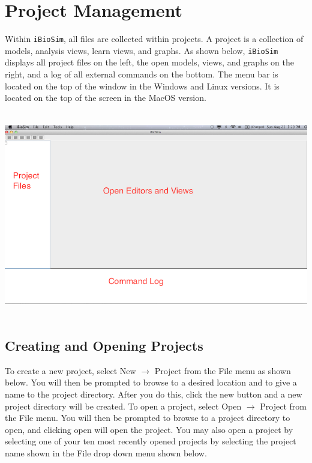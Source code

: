 \documentclass[titlepage,11pt]{article}
\begin{document}
\clearpage

\section{Project Management}

\noindent
Within {\tt iBioSim}, all files are collected within projects.   
A project is a collection of models, analysis views, learn views, and graphs.  As shown below, {\tt iBioSim} displays all project files on the left, the open models, views, and graphs on the right, and a log of all external commands on the bottom.  The menu bar is located on the top of the window in the Windows and Linux versions.  It is located on the top of the screen in the MacOS version.

\begin{center}
\includegraphics[height=90mm]{screenshots/iBioSim}
\end{center}

\clearpage

\subsection{Creating and Opening Projects}

\noindent
To create a new project, select New $\rightarrow$ Project from the File menu as shown below.  You will then be prompted to browse to a desired location and to give a name to the project directory.  After you do this, click the new button and a new project directory will be created.  To open a project, select Open $\rightarrow$ Project from the File menu.  You will then be prompted to browse to a project directory to open, and clicking open will open the project. You may also open a project by selecting one of your ten most recently opened projects by selecting the project name shown in the File drop down menu shown below. 
\end{document}
